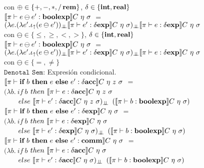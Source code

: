 con $\oplus \in \{ +,-,*,/\,\textbf{rem} \}$, $\delta \in \{\textbf{int},\textbf{real}\}$\\

$\llbracket  \pi \vdash e \ominus e' : \textbf{boolexp}  \rrbracket C \ \eta \ \sigma$ 
$=$ \\
\indent \indent \indent 
$(\lambda e . (\lambda e' . \iota_{\uparrow} (e \ominus e'))_{\bot \!\!\! \bot}
\llbracket \pi \vdash e' : \delta \textbf{exp} \rrbracket C \ \eta \ \sigma)_{\bot \!\!\! \bot}
\llbracket \pi \vdash e : \delta \textbf{exp} \rrbracket C \ \eta \ \sigma$\\

con $\ominus \in \{\leq,\geq,<,> \}$, $\delta \in \{\textbf{int},\textbf{real}\}$\\

$\llbracket  \pi \vdash e \ominus e' : \textbf{boolexp}  \rrbracket C \ \eta \ \sigma$ 
$=$ \\
\indent \indent \indent 
$(\lambda e . (\lambda e' . \iota_{\uparrow} (e \ominus e'))_{\bot \!\!\! \bot}
\llbracket \pi \vdash e' : \delta \textbf{exp} \rrbracket C \ \eta \ \sigma)_{\bot \!\!\! \bot}
\llbracket \pi \vdash e : \delta \textbf{exp} \rrbracket C \ \eta \ \sigma$\\

con $\ominus \in \{=,\neq\}$\\

\noindent
$\texttt{Denotal Sem:}$ Expresi\'on condicional.\\

$\llbracket  \pi \vdash \textbf{if} \ b \ \textbf{then} \ e \ \textbf{else} \ e': \delta \textbf{acc} \rrbracket C \ \eta \ z \ \sigma$ 
$=$ \\
\indent \indent \indent 
$(\lambda b . \ if \ b $ $then \ \llbracket  \pi \vdash e : \delta \textbf{acc} \rrbracket C \ \eta \ z \ \sigma$\\
\indent \indent \indent \indent \indent \ \ \ \
$else \ \llbracket  \pi \vdash e' : \delta \textbf{acc} \rrbracket C \ \eta \ z \ \sigma)_{\bot \!\!\! \bot}$ 
$(\semBrcks{ \pi \vdash b : \boolexp}C \ \eta \ \sigma)$\\

$\llbracket  \pi \vdash \textbf{if} \ b \ \textbf{then} \ e \ \textbf{else} \ e': \delta \textbf{exp} \rrbracket C \ \eta \ \sigma$ 
$=$ \\
\indent \indent \indent 
$(\lambda b . \ if \ b $ $then \ \llbracket  \pi \vdash e : \delta \textbf{exp} \rrbracket C \ \eta \ \sigma$\\
\indent \indent \indent \indent \indent \ \ \ \
$else \ \llbracket  \pi \vdash e' : \delta \textbf{exp} \rrbracket C \ \eta \ \sigma)_{\bot \!\!\! \bot}$ 
$(\semBrcks{ \pi \vdash b : \boolexp}C \ \eta \ \sigma)$\\

$\llbracket  \pi \vdash \textbf{if} \ b \ \textbf{then} \ e \ \textbf{else} \ e': \textbf{comm} \rrbracket C \ \eta \ \sigma$ 
$=$ \\
\indent \indent \indent 
$(\lambda b . \ if \ b $ $then \ \llbracket  \pi \vdash e : \delta \textbf{acc} \rrbracket C \ \eta \ \sigma$\\
\indent \indent \indent \indent \indent \ \ \ \
$else \ \llbracket  \pi \vdash e' : \delta \textbf{acc} \rrbracket C \ \eta \ \sigma)_{\bot \!\!\! \bot}$ 
$(\semBrcks{ \pi \vdash b : \boolexp}C \ \eta \ \sigma)$\\

